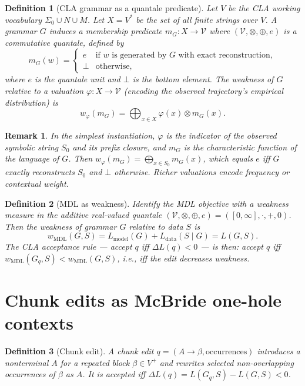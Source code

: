\documentclass[11pt]{article}
\newtheorem{definition}{Definition}
\newtheorem{remark}{Remark}
\begin{document}
\begin{definition}[CLA grammar as a quantale predicate]
\label{def:cla-quantale}
Let $V$ be the CLA working vocabulary $\Sigma_0 \cup N \cup M$.  Let $X = V^*$ be the set of all finite strings over $V$.  A grammar $G$ induces a \emph{membership predicate} $m_G : X \to \mathcal{V}$ where $(\mathcal{V}, \otimes, \oplus, e)$ is a commutative quantale, defined by
\[
  m_G(w) = \begin{cases} e & \text{if } w \text{ is generated by } G \text{ with exact reconstruction}, \\ \bot & \text{otherwise,} \end{cases}
\]
where $e$ is the quantale unit and $\bot$ is the bottom element.  The \emph{weakness} of $G$ relative to a valuation $\varphi : X \to \mathcal{V}$ (encoding the observed trajectory's empirical distribution) is
\[
  w_\varphi(m_G) = \bigoplus_{x \in X} \varphi(x) \otimes m_G(x).
\]
\end{definition}

\begin{remark}
In the simplest instantiation, $\varphi$ is the indicator of the observed symbolic string $S_0$ and its prefix closure, and $m_G$ is the characteristic function of the language of $G$.  Then $w_\varphi(m_G) = \bigoplus_{x \in S_0} m_G(x)$, which equals $e$ iff $G$ exactly reconstructs $S_0$ and $\bot$ otherwise.  Richer valuations encode frequency or contextual weight.
\end{remark}

\begin{definition}[MDL as weakness]
\label{def:mdl-weakness}
Identify the MDL objective with a weakness measure in the additive real-valued quantale $(\mathcal{V}, \otimes, \oplus, e) = ([0,\infty], \cdot, +, 0)$.  Then the weakness of grammar $G$ relative to data $S$ is
\[
  w_{\text{MDL}}(G, S) = L_{\text{model}}(G) + L_{\text{data}}(S \mid G) = L(G, S).
\]
The CLA acceptance rule --- accept $q$ iff $\Delta L(q) < 0$ --- is then: accept $q$ iff $w_{\text{MDL}}(G_q, S) < w_{\text{MDL}}(G, S)$, i.e., iff the edit \emph{decreases} weakness.
\end{definition}

\section{Chunk edits as McBride one-hole contexts}

\begin{definition}[Chunk edit]
\label{def:chunk-edit}
A \emph{chunk edit} $q = (A \to \beta, \text{occurrences})$ introduces a nonterminal $A$ for a repeated block $\beta \in V^+$ and rewrites selected non-overlapping occurrences of $\beta$ as $A$.  It is accepted iff $\Delta L(q) = L(G_q, S) - L(G, S) < 0$.
\end{definition}
\end{document}

